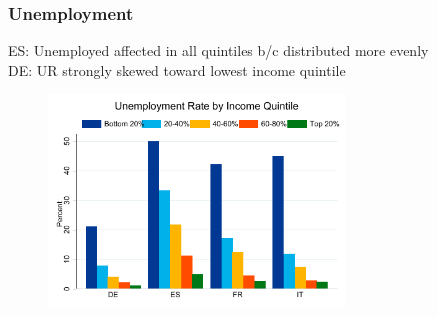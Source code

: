 \documentclass[pdflatex,aspectratio=169]{beamer}
\begin{document}
\begin{frame}\frametitle{\bf Unemployment}
ES: Unemployed affected in all quintiles b/c distributed more evenly\\
DE: UR strongly skewed toward lowest income quintile
\begin{figure}
\begin{center}
\includegraphics[width=0.7\textwidth]{./figures/URbyIncQuint.pdf}
\end{center}
\end{figure}
\end{frame}
\end{document}
